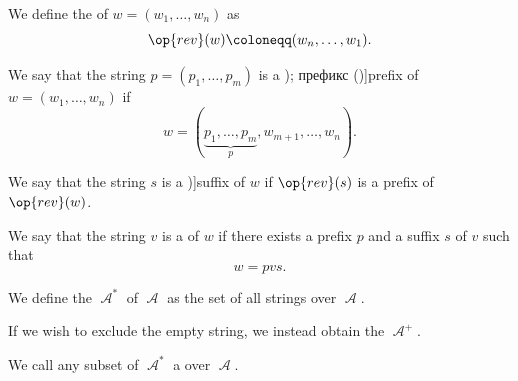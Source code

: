 \begin{definition}
\begin{thmenum}
    \mimprovised We define the  of \( w = (w_1, \ldots, w_n) \) as
    \begin{equation*}
      \op{rev}(w) \coloneqq (w_n, \ldots, w_1).
    \end{equation*}

    \mimprovised We say that the string \( p = (p_1, \ldots, p_m) \) is a \term[ru=начало (\cite[20]{Гладкий1973ГрамматикиИЯзыки}); префикс (\cite[261]{Яблонский2003ДискретнаяМатематика})]{prefix} of \( w = (w_1, \ldots, w_n) \) if
    \begin{equation*}
      w = (\underbrace{p_1, \ldots, p_m}_p, w_{m+1}, \ldots, w_n).
    \end{equation*}

    \mimprovised We say that the string \( s \) is a \term[ru=конец (\cite[20]{Гладкий1973ГрамматикиИЯзыки})]{suffix} of \( w \) if \( \op{rev}(s) \) is a prefix of \( \op{rev}(w) \).

    \mimprovised We say that the string \( v \) is a  of \( w \) if there exists a prefix \( p \) and a suffix \( s \) of \( v \) such that
    \begin{equation*}
      w = p v s.
    \end{equation*}

     We define the  \( \mscrA^* \) of \( \mscrA \) as the set of all strings over \( \mscrA \).

    \mimprovised If we wish to exclude the empty string, we instead obtain the  \( \mscrA^+ \).

     We call any subset of \( \mscrA^* \) a  over \( \mscrA \).
  \end{thmenum}
\end{definition}


